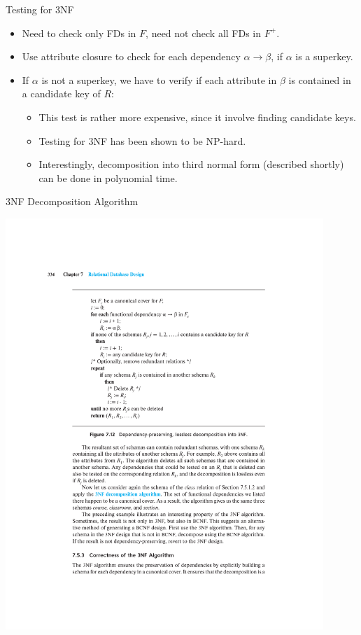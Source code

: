 \documentclass{beamer}
\begin{document}
\begin{frame}{Testing for 3NF}
    \begin{itemize}
        \item Need to check only FDs in $F$, need not check all FDs in $F^+$.
        \item Use attribute closure to check for each dependency $\alpha \rightarrow \beta$, if $\alpha$ is a superkey.
        \item If $\alpha$ is not a superkey, we have to verify if each attribute in $\beta$ is contained in a candidate key of $R$:
            \begin{itemize}
                \item This test is rather more expensive, since it involve finding candidate keys.
                \item Testing for 3NF has been shown to be NP-hard.
                \item Interestingly, decomposition into third normal form (described shortly) can be done in polynomial time.
            \end{itemize}
    \end{itemize}
\end{frame}

\begin{frame}{3NF Decomposition Algorithm}
    \begin{center}
        \includegraphics[width=0.9\textwidth, trim={5.5cm 12.75cm 3cm 4.5cm}, clip]{figures/p334_Decomposition_3NF}
    \end{center}
\end{frame}
\end{document}
